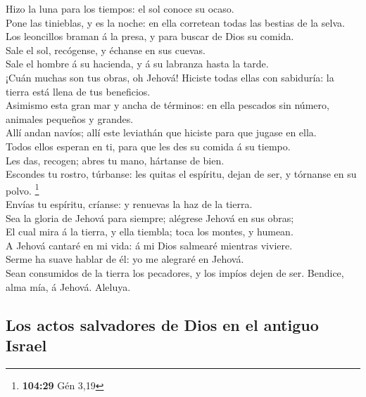  Hizo la luna para los tiempos: el sol conoce su ocaso.\\
 Pone las tinieblas, y es la noche: en ella corretean todas
las bestias de la selva.\\
 Los leoncillos braman á la presa, y para buscar de Dios su
comida.\\
 Sale el sol, recógense, y échanse en sus cuevas.\\
 Sale el hombre á su hacienda, y á su labranza hasta la
tarde.\\
 ¡Cuán muchas son tus obras, oh Jehová! Hiciste todas ellas
con sabiduría: la tierra está llena de tus beneficios.\\
 Asimismo esta gran mar y ancha de términos: en ella
pescados sin número, animales pequeños y grandes.\\
 Allí andan navíos; allí este leviathán que hiciste para
que jugase en ella.\\
 Todos ellos esperan en ti, para que les des su comida á su
tiempo.\\
 Les das, recogen; abres tu mano, hártanse de bien.\\
 Escondes tu rostro, túrbanse: les quitas el espíritu,
dejan de ser, y tórnanse en su polvo. \footnote{\textbf{104:29} Gén 3,19}\\
 Envías tu espíritu, críanse: y renuevas la haz de la
tierra.\\
 Sea la gloria de Jehová para siempre; alégrese Jehová en
sus obras;\\
 El cual mira á la tierra, y ella tiembla; toca los montes,
y humean.\\
 A Jehová cantaré en mi vida: á mi Dios salmearé mientras
viviere.\\
 Serme ha suave hablar de él: yo me alegraré en Jehová.\\
 Sean consumidos de la tierra los pecadores, y los impíos
dejen de ser. Bendice, alma mía, á Jehová. Aleluya.

\hypertarget{los-actos-salvadores-de-dios-en-el-antiguo-israel}{%
\subsection{Los actos salvadores de Dios en el antiguo
Israel}\label{los-actos-salvadores-de-dios-en-el-antiguo-israel}}

